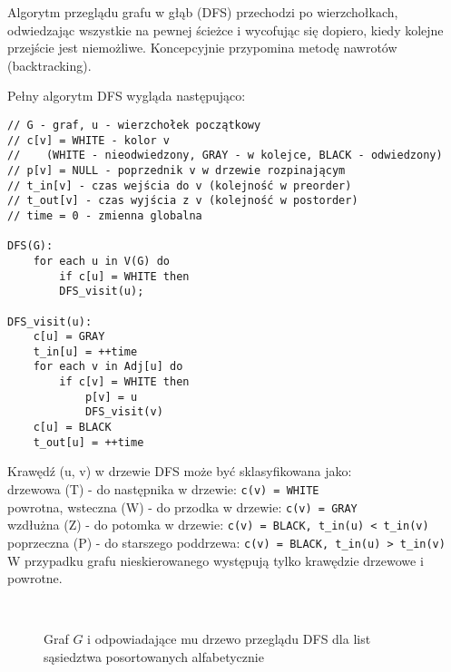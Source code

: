 Algorytm przeglądu grafu w głąb (DFS) przechodzi po wierzchołkach, odwiedzając wszystkie na pewnej ścieżce i wycofując się dopiero, kiedy kolejne przejście jest niemożliwe. Koncepcyjnie przypomina metodę nawrotów (backtracking).

Pełny algorytm DFS wygląda następująco:
\begin{verbatim}
// G - graf, u - wierzchołek początkowy
// c[v] = WHITE - kolor v
//    (WHITE - nieodwiedzony, GRAY - w kolejce, BLACK - odwiedzony)
// p[v] = NULL - poprzednik v w drzewie rozpinającym
// t_in[v] - czas wejścia do v (kolejność w preorder)
// t_out[v] - czas wyjścia z v (kolejność w postorder)
// time = 0 - zmienna globalna

DFS(G):
    for each u in V(G) do
        if c[u] = WHITE then
        DFS_visit(u);

DFS_visit(u):
    c[u] = GRAY
    t_in[u] = ++time
    for each v in Adj[u] do
        if c[v] = WHITE then
            p[v] = u
            DFS_visit(v)
    c[u] = BLACK
    t_out[u] = ++time
\end{verbatim}

Krawędź (u, v) w drzewie DFS może być sklasyfikowana jako: \\
drzewowa (T) - do następnika w drzewie: \texttt{c(v) = WHITE} \\
powrotna, wsteczna (W) - do przodka w drzewie: \texttt{c(v) = GRAY} \\
wzdłużna (Z) - do potomka w drzewie: \texttt{c(v) = BLACK, t\_in(u) < t\_in(v)} \\
poprzeczna (P) - do starszego poddrzewa: \texttt{c(v) = BLACK, t\_in(u) > t\_in(v)} \\
W przypadku grafu nieskierowanego występują tylko krawędzie drzewowe i powrotne.

\begin{figure}[H]
    \centering
    \begin{subfigure}
        \centering
        \resizebox{0.45\textwidth}{!}{
            
        }
    \end{subfigure}%
    ~
    \begin{subfigure}
        \centering
        \resizebox{0.45\textwidth}{!}{
            
        }
    \end{subfigure}
    \caption{Graf \( G \) i odpowiadające mu drzewo przeglądu DFS dla list sąsiedztwa posortowanych alfabetycznie}
    \label{fig:num_bits}
\end{figure}

